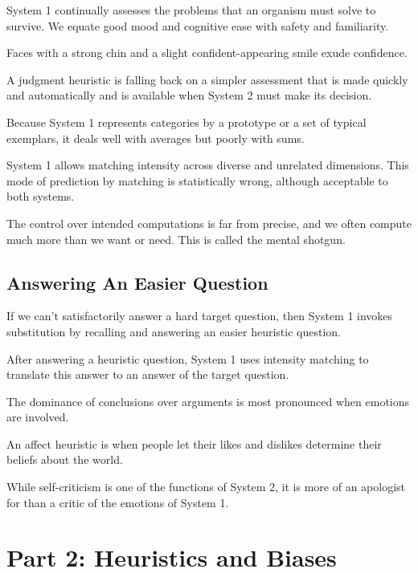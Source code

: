 \bit
\item System 1 continually assesses the problems that an organism must solve to survive. We equate good mood and
cognitive ease with safety and familiarity.
\item Faces with a strong chin and a slight confident-appearing smile exude confidence.
\item A judgment heuristic is falling back on a simpler assessment that is made quickly and automatically and is
available when System 2 must make its decision.
\item Because System 1 represents categories by a prototype or a set of typical exemplars, it deals well with
averages but poorly with sums.
\item System 1 allows matching intensity across diverse and unrelated dimensions. This mode of prediction by matching
is statistically wrong, although acceptable to both systems.
\item The control over intended computations is far from precise, and we often compute much more than we want or need.
This is called the mental shotgun.
\eit

\subsection*{Answering An Easier Question}
\bit
\item If we can't satisfactorily answer a hard target question, then System 1 invokes substitution by recalling and
answering an easier heuristic question.
\item After answering a heuristic question, System 1 uses intensity matching to translate this answer to an answer of
the target question.
\item The dominance of conclusions over arguments is most pronounced when emotions are involved.
\item An affect heuristic is when people let their likes and dislikes determine their beliefs about the world.
\item While self-criticism is one of the functions of System 2, it is more of an apologist for than a critic of the
emotions of System 1.
\eit

\section*{Part 2: Heuristics and Biases}


